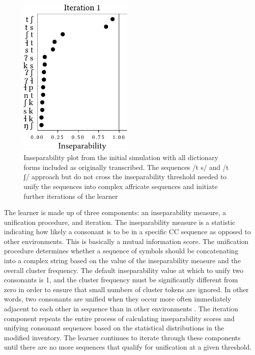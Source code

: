 \documentclass[output=paper,colorlinks,citecolor=brown]{langscibook}
\begin{document}
\begin{figure}
   \includegraphics[width=0.5\textwidth]{figures/insepPlotInitial.pdf}
    \caption{Inseparability plot from the initial simulation with all dictionary forms included as originally transcribed. The sequences {/t s/} and {/t ʃ/} approach but do not cross the inseparability threshold needed to unify the sequences into complex affricate sequences and initiate further iterations of the learner}
    \label{fig:insepPlot1}
\end{figure}

The learner is made up of three components: an inseparability measure, a unification procedure, and iteration. The inseparability measure is a statistic indicating how likely a consonant is to be in a specific CC sequence as opposed to other environments. This is basically a mutual information score. The unification procedure determines whether a sequence of symbols should be concatenating into a complex string based on the value of the inseparability measure and the overall cluster frequency. The default inseparability value at which to unify two consonants is 1, and the cluster frequency must be significantly different from zero in order to ensure that small numbers of cluster tokens are ignored. In other words, two consonants are unified when they occur more often immediately adjacent to each other in sequence than in other environments \citep{Gouskova2021}. The iteration component repeats the entire process of calculating inseparability scores and unifying consonant sequences based on the statistical distributions in the modified inventory. The learner continues to iterate through these components until there are no more sequences that qualify for unification at a given threshold.
\end{document}
